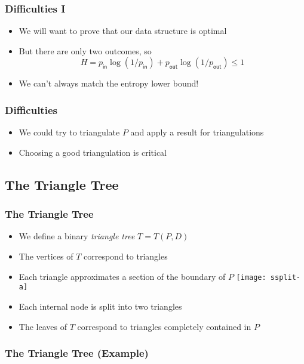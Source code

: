 \documentclass{beamer}
\newcommand{\pin}{p_{\mathsf{in}}}
\newcommand{\pout}{p_{\mathsf{out}}}
\begin{document}
\frame
{
   \frametitle{Difficulties I}
   \begin{itemize}
   \item<1-> We will want to prove that our data structure is optimal
   \item<2-> But there are only two outcomes, so
     \[ H= \pin\log (1/\pin) + \pout\log(1/\pout) \le 1  \]
   \item<3-> We can't always match the entropy lower bound!
   \end{itemize}
}

\frame
{
   \frametitle{Difficulties}
   \begin{itemize}
     \item<1-> We could try to triangulate $P$ and apply a result for 
	triangulations\\
     \item<4-> Choosing a good triangulation is critical
   \end{itemize}
}

\subsection{The Triangle Tree}
\frame
{
   \frametitle{The Triangle Tree}
   \begin{itemize}
    \item<1-> We define a binary \emph{triangle tree} $T=T(P,D)$
    \item<2-> The vertices of $T$ correspond to triangles
    \item<3-> Each triangle approximates a section of the boundary of $P$
    {\texttt{[image: ssplit-a]}}
    \item<4-> Each internal node is split into two triangles
    \item<8-> The leaves of $T$ correspond to triangles completely
	contained in $P$
   \end{itemize}
}

\frame
{
   \frametitle{The Triangle Tree (Example)}
   \\
}
\end{document}
